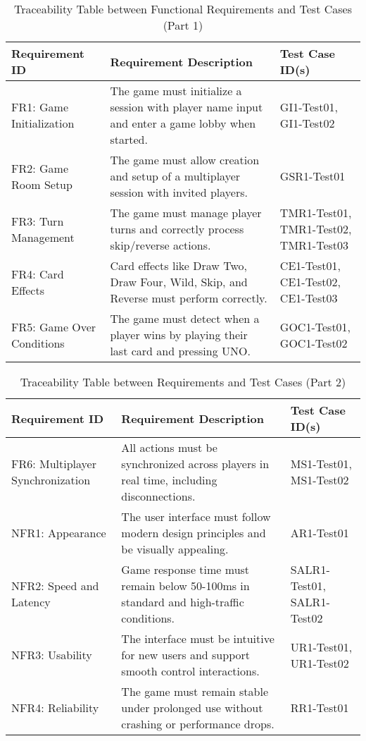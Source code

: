 \documentclass[12pt]{article}
\begin{document}
\begin{table}[H]
\centering
\begin{tabularx}{\textwidth}{|l|X|X|}
\hline
\textbf{Requirement ID} & \textbf{Requirement Description} & \textbf{Test Case ID(s)} \\ \hline
FR1: Game Initialization & The game must initialize a session with player name input and enter a game lobby when started. & GI1-Test01, GI1-Test02 \\ \hline
FR2: Game Room Setup & The game must allow creation and setup of a multiplayer session with invited players. & GSR1-Test01 \\ \hline
FR3: Turn Management & The game must manage player turns and correctly process skip/reverse actions. & TMR1-Test01, TMR1-Test02, TMR1-Test03 \\ \hline
FR4: Card Effects & Card effects like Draw Two, Draw Four, Wild, Skip, and Reverse must perform correctly. & CE1-Test01, CE1-Test02, CE1-Test03 \\ \hline
FR5: Game Over Conditions & The game must detect when a player wins by playing their last card and pressing UNO. & GOC1-Test01, GOC1-Test02 \\ \hline
\end{tabularx}
\caption{Traceability Table between Functional Requirements and Test Cases (Part 1)}
\end{table}

\begin{table}[H]
\centering
\begin{tabularx}{\textwidth}{|l|X|X|}
\hline
\textbf{Requirement ID} & \textbf{Requirement Description} & \textbf{Test Case ID(s)} \\ \hline
FR6: Multiplayer Synchronization & All actions must be synchronized across players in real time, including disconnections. & MS1-Test01, MS1-Test02 \\ \hline
NFR1: Appearance & The user interface must follow modern design principles and be visually appealing. & AR1-Test01 \\ \hline
NFR2: Speed and Latency & Game response time must remain below 50-100ms in standard and high-traffic conditions. & SALR1-Test01, SALR1-Test02 \\ \hline
NFR3: Usability & The interface must be intuitive for new users and support smooth control interactions. & UR1-Test01, UR1-Test02 \\ \hline
NFR4: Reliability & The game must remain stable under prolonged use without crashing or performance drops. & RR1-Test01 \\ \hline
\end{tabularx}
\caption{Traceability Table between Requirements and Test Cases (Part 2)}
\end{table}
\end{document}

